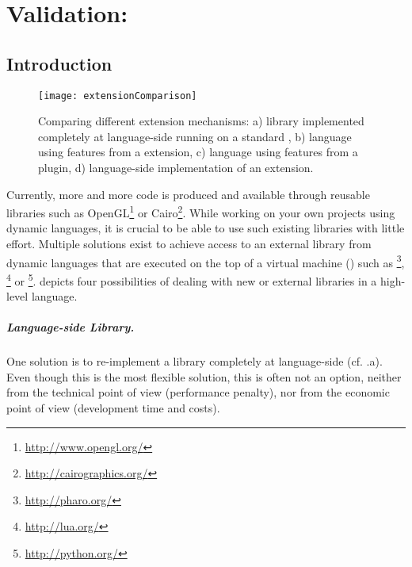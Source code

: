 
\chapter{Validation: \FFI}
\minitoc
\section{Introduction}

\begin{figure*}[ht]
	\centering
	\texttt{[image: extensionComparison]}
	\caption{Comparing different extension mechanisms: 
		a) library implemented completely at language-side running on a standard \VM,
		b) language using features from a \VM extension,
		c) language using features from a \VM plugin,
		d) language-side implementation of an extension.}
\end{figure*}

Currently, more and more code is produced and available through reusable libraries such as OpenGL\footnote{\url{http://www.opengl.org/}} or Cairo\footnote{\url{http://cairographics.org/}}.
While working on your own projects using dynamic languages, it is crucial to be able to use such existing libraries with little effort.
Multiple solutions exist to achieve access to an external library from dynamic languages that are executed on the top of a virtual machine (\VM) such as \PH\footnote{\url{http://pharo.org/}}, \Lua\footnote{\url{http://lua.org/}} or \Python\footnote{\url{http://python.org/}}.
 depicts four possibilities of dealing with new or external libraries in a high-level language.

\paragraph{Language-side Library.}
One solution is to re-implement a library completely at language-side (cf. .a).
Even though this is the most flexible solution, this is often not an option, neither from the technical point of view (performance penalty), nor from the economic point of view (development time and costs).

